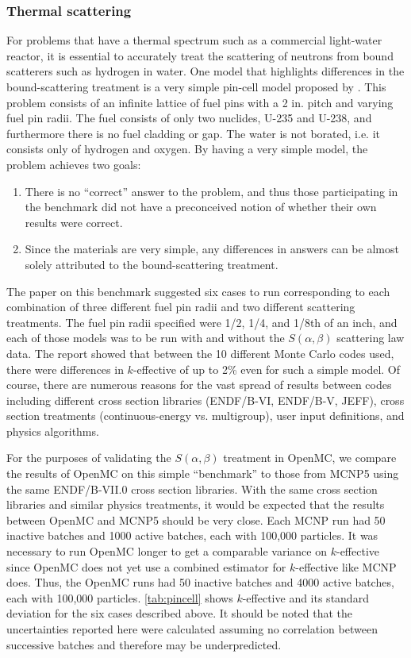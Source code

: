 \documentclass[authoryear,preprint]{elsarticle}
\begin{document}
\subsubsection{Thermal scattering}

For problems that have a thermal spectrum such as a commercial light-water
reactor, it is essential to accurately treat the scattering of neutrons from
bound scatterers such as hydrogen in water. One model that highlights
differences in the bound-scattering treatment is a very simple pin-cell model
proposed by \citet{pincell}. This problem consists of an infinite lattice of
fuel pins with a 2 in. pitch and varying fuel pin radii. The fuel consists of
only two nuclides, U-235 and U-238, and furthermore there is no fuel cladding or
gap. The water is not borated, i.e. it consists only of hydrogen and oxygen. By
having a very simple model, the problem achieves two goals:
\begin{enumerate}
  \item There is no ``correct'' answer to the problem, and thus those
    participating in the benchmark did not have a preconceived notion of whether
    their own results were correct.
  \item Since the materials are very simple, any differences in answers can be
    almost solely attributed to the bound-scattering treatment.
\end{enumerate}

The paper on this benchmark suggested six cases to run corresponding to each
combination of three different fuel pin radii and two different scattering
treatments. The fuel pin radii specified were 1/2, 1/4, and 1/8th of an inch,
and each of those models was to be run with and without the $S(\alpha,\beta)$
scattering law data. The report showed that between the 10 different Monte Carlo
codes used, there were differences in $k$-effective of up to 2\% even for such a
simple model. Of course, there are numerous reasons for the vast spread of
results between codes including different cross section libraries (ENDF/B-VI,
ENDF/B-V, JEFF), cross section treatments (continuous-energy vs. multigroup),
user input definitions, and physics algorithms.

For the purposes of validating the $S(\alpha,\beta)$ treatment in OpenMC, we
compare the results of OpenMC on this simple ``benchmark'' to those from MCNP5
using the same ENDF/B-VII.0 cross section libraries. With the same cross section
libraries and similar physics treatments, it would be expected that the results
between OpenMC and MCNP5 should be very close. Each MCNP run had 50 inactive
batches and 1000 active batches, each with 100,000 particles. It was necessary
to run OpenMC longer to get a comparable variance on $k$-effective since OpenMC
does not yet use a combined estimator for $k$-effective like MCNP does. Thus, the
OpenMC runs had 50 inactive batches and 4000 active batches, each with 100,000
particles. \autoref{tab:pincell} shows $k$-effective and its standard deviation
for the six cases described above. It should be noted that the uncertainties
reported here were calculated assuming no correlation between successive batches
and therefore may be underpredicted.
\end{document}
